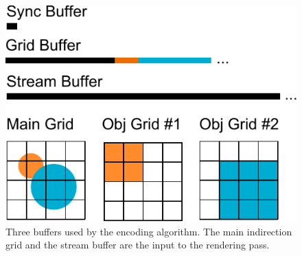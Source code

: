 \documentclass[11pt,a4paper,twoside]{article}
\begin{document}
%
%

\begin {figure}
	\centering
	\includegraphics[width=0.4\columnwidth] {figures/data_buffers}
	\caption {Three buffers used by the encoding algorithm. The main indirection grid and the stream buffer are the input to the rendering pass.}
	\label {fig:data_buffers}
\end {figure}
\end{document}
